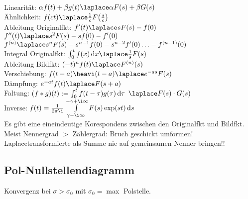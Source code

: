 \documentclass[german]{latex4ei/latex4ei_sheet}
\renewcommand{\diff}{\mathop{}\!\mathrm{\vphantom( d}}
\begin{document}
\begin{sectionbox}
\begin{tabular}{rl|rl}
	\end{tabular}\\
	\everymath{\textstyle}
	Linearität: $\alpha f(t) + \beta g(t) \laplace \alpha F(s) + \beta G(s)$\\
	Ähnlichkeit: $f(ct) \laplace \frac{1}{c} F\bigl(  \frac{s}{c} \bigr)$\\
	Ableitung Originalfkt: $f'(t) \laplace s F(s) - f(0)$ \quad $f''(t) \laplace s^2 F(s) - sf(0) - f'(0)$\\
	$f^{(n)} \laplace s^n F(s) - s^{n-1} f(0) - s^{n-2} f'(0) \ldots - f^{(n-1)}(0)$\\
	Integral Originalfkt: $\int_0^t f(x) \diff x \laplace \frac{1}{s} F(s)$\\
	Ableitung Bildfkt: $(-t)^n f(t) \laplace F^{(n)} (s)$\\
	Verschiebung: $f(t-a)\heavi(t-a) \laplace e^{-as} F(s)$\\
	Dämpfung: $e^{-at} f(t) \laplace F(s+a)$\\
	Faltung: $(f * g)(t) := \int_0^t f( t - \tau) g(\tau) \diff \tau$ $\laplace F(s) \cdot G(s)$\\
	Inverse: $f(t) = \frac{1}{2\pi \i} \int\limits_{\gamma - \i \infty}^{-\gamma + \i \infty} F(s) \exp(st) \diff s$\\
	Es gibt eine eineindeutige Korespondens zwischen den Originalfkt und Bildfkt.
	Meist Nennergrad $>$ Zählergrad: Bruch geschickt umformen!
	Laplacetransformierte als Summe nie auf gemeinsamen Nenner bringen!!


	\subsection{Pol-Nullstellendiagramm}
	Konvergenz bei $\sigma > \sigma_0$ mit $\sigma_0 = \max$ Polstelle.\\
\end{sectionbox}

\end{document}
